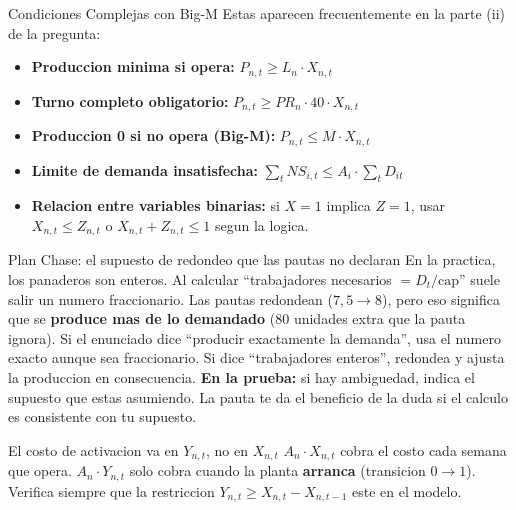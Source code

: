 \documentclass[11pt, a4paper]{article}
\begin{document}
\begin{tipprueba}{Condiciones Complejas con Big-M}
  Estas aparecen frecuentemente en la parte (ii) de la pregunta:
  \begin{itemize}[leftmargin=1.2em, itemsep=3pt]
    \item \textbf{Produccion minima si opera:}
      $P_{n,t} \ge L_n \cdot X_{n,t}$
    \item \textbf{Turno completo obligatorio:}
      $P_{n,t} \ge PR_n \cdot 40 \cdot X_{n,t}$
    \item \textbf{Produccion 0 si no opera (Big-M):}
      $P_{n,t} \le M \cdot X_{n,t}$
    \item \textbf{Limite de demanda insatisfecha:}
      $\displaystyle\sum_t NS_{i,t} \le A_i \cdot \sum_t D_{it}$
    \item \textbf{Relacion entre variables binarias:} si $X=1$ implica $Z=1$,
      usar $X_{n,t} \le Z_{n,t}$ o $X_{n,t} + Z_{n,t} \le 1$ segun la logica.
  \end{itemize}
\end{tipprueba}

\begin{trampa}{Plan Chase: el supuesto de redondeo que las pautas no declaran}
  En la practica, los panaderos son enteros. Al calcular ``trabajadores necesarios $= D_t / \text{cap}$''
  suele salir un numero fraccionario. Las pautas redondean ($7{,}5 \to 8$), pero eso
  significa que se \textbf{produce mas de lo demandado} (80 unidades extra que la pauta ignora).
  Si el enunciado dice ``producir exactamente la demanda'', usa el numero exacto aunque sea fraccionario.
  Si dice ``trabajadores enteros'', redondea y ajusta la produccion en consecuencia.
  \medskip
  \textbf{En la prueba:} si hay ambiguedad, indica el supuesto que estas asumiendo.
  La pauta te da el beneficio de la duda si el calculo es consistente con tu supuesto.
\end{trampa}

\begin{trampa}{El costo de activacion va en $Y_{n,t}$, no en $X_{n,t}$}
  $A_n \cdot X_{n,t}$ cobra el costo cada semana que opera.
  $A_n \cdot Y_{n,t}$ solo cobra cuando la planta \textbf{arranca} (transicion $0 \to 1$).
  Verifica siempre que la restriccion $Y_{n,t} \ge X_{n,t} - X_{n,t-1}$ este en el modelo.
\end{trampa}

\end{document}
